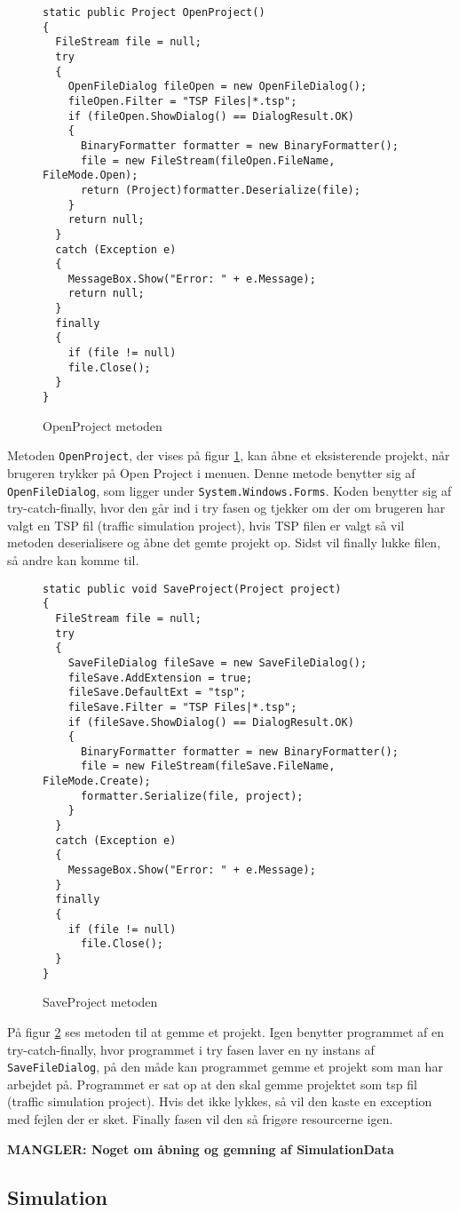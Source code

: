 \begin{figure}[H]
\begin{lstlisting}
static public Project OpenProject()
{
  FileStream file = null;
  try
  {
    OpenFileDialog fileOpen = new OpenFileDialog();
    fileOpen.Filter = "TSP Files|*.tsp";
    if (fileOpen.ShowDialog() == DialogResult.OK)
    {
      BinaryFormatter formatter = new BinaryFormatter();
      file = new FileStream(fileOpen.FileName, FileMode.Open);
      return (Project)formatter.Deserialize(file);
    }
    return null;
  }
  catch (Exception e)
  {
    MessageBox.Show("Error: " + e.Message);
    return null;
  }
  finally
  {
    if (file != null)
    file.Close();
  }
}
\end{lstlisting}
\caption{OpenProject metoden}\label{OpenProjectCode}
\end{figure}

Metoden \texttt{OpenProject}, der vises på figur \ref{OpenProjectCode}, kan åbne et eksisterende projekt, når brugeren trykker på Open Project i menuen. Denne metode benytter sig af \texttt{OpenFileDialog}, som ligger under \texttt{System.Windows.Forms}. Koden benytter sig af try-catch-finally, hvor den går ind i try fasen og tjekker om der om brugeren har valgt en TSP fil (traffic simulation project), hvis TSP filen er valgt så vil metoden deserialisere og åbne det gemte projekt op. Sidst vil finally lukke filen, så andre kan komme til.

\begin{figure}[H]
\begin{lstlisting}
static public void SaveProject(Project project)
{ 
  FileStream file = null;
  try
  {
    SaveFileDialog fileSave = new SaveFileDialog();
    fileSave.AddExtension = true;
    fileSave.DefaultExt = "tsp";
    fileSave.Filter = "TSP Files|*.tsp";
    if (fileSave.ShowDialog() == DialogResult.OK)
    {
      BinaryFormatter formatter = new BinaryFormatter();
      file = new FileStream(fileSave.FileName, FileMode.Create);
      formatter.Serialize(file, project);
    }
  }
  catch (Exception e)
  {
    MessageBox.Show("Error: " + e.Message);
  }
  finally
  {
    if (file != null)
      file.Close();
  }
}
\end{lstlisting}
\caption{SaveProject metoden}\label{SaveProjectCode}
\end{figure}

På figur \ref{SaveProjectCode} ses metoden til at gemme et projekt. Igen benytter programmet af en try-catch-finally, hvor programmet i try fasen laver en ny instans af \texttt{SaveFileDialog}, på den måde kan programmet gemme et projekt som man har arbejdet på. Programmet er sat op at den skal gemme projektet som tsp fil (traffic simulation project). Hvis det ikke lykkes, så vil den kaste en exception med fejlen der er sket. Finally fasen vil den så frigøre resourcerne igen.

\vspace{5mm}

\textbf{MANGLER: Noget om åbning og gemning af SimulationData}

\subsection{Simulation}\label{SimulationClass}